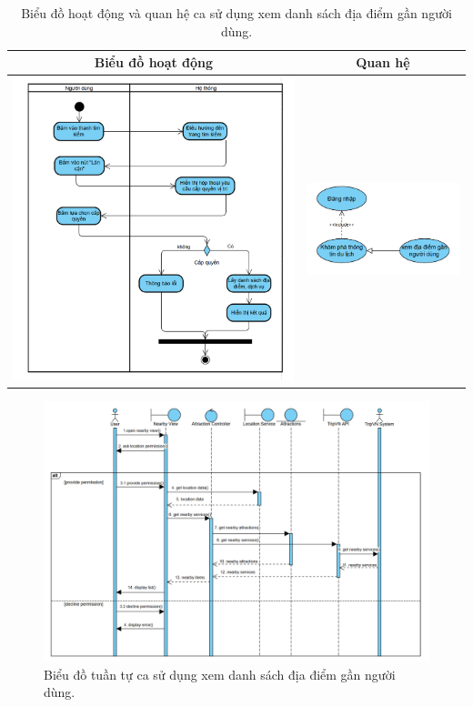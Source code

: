 \begin{table}[H] %
    \centering
    \caption{Biểu đồ hoạt động và quan hệ ca sử dụng xem danh sách địa điểm gần người dùng.} %
    \label{tab:uc_nearby_places_diagrams} %
    \begin{tabular}{| c | c |}
        \hline
        \textbf{Biểu đồ hoạt động} & \textbf{Quan hệ} \\
        \hline
        \includegraphics[width=0.5\linewidth]{figures/c3/3-3-7-ad.png} %
        &
        \includegraphics[width=0.45\linewidth]{figures/c3/3-3-7-rd.png} \\ %
        \hline
    \end{tabular}
\end{table}

\begin{figure}[H]
    \centering
    \includegraphics[width=1\textwidth]{figures/c3/3-3-7-sd.png} %
    \caption{Biểu đồ tuần tự ca sử dụng xem danh sách địa điểm gần người dùng.}
    \label{fig:3-3-7-sequence-diagram}
\end{figure}